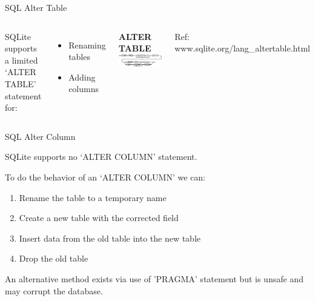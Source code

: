 \documentclass{beamer}
\begin{document}
\begin{frame}{SQL Alter Table} \footnotesize 

\begin{columns}

\vspace{6pt} SQLite supports a limited `ALTER TABLE' statement for:
\begin{itemize} \setlength\itemindent{-5pt}\itemsep-1pt
  \item Renaming tables
  \item Adding columns
\end{itemize}

\vspace{12pt} {\bf ALTER TABLE} \\
\vspace{4pt} \includegraphics[scale=0.35]{alter-table-stmt.eps}

{\vspace{6pt} \tiny Ref: www.sqlite.org/lang\_altertable.html} 
\end{columns}

\end{frame}
\begin{frame}{SQL Alter Column} \footnotesize 

\vspace{8pt} SQLite supports no `ALTER COLUMN' statement.

\vspace{12pt} To do the behavior of an `ALTER COLUMN' we can:
\begin{enumerate} %
  \item Rename the table to a temporary name
  \item Create a new table with the corrected field
  \item Insert data from the old table into the new table
  \item Drop the old table
\end{enumerate}

\vspace{12pt} An alternative method exists via use of 'PRAGMA' statement but is unsafe and may corrupt the database.

\end{frame}
\end{document}
